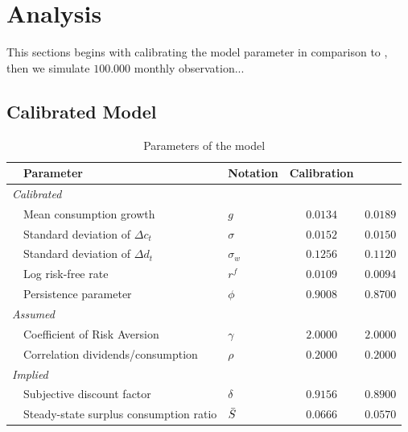 \section{Analysis} \label{sec:Analysis}

This sections begins with calibrating the model parameter in comparison to \cite{Campbell1999}, then we simulate $100.000$ monthly observation...

\subsection{Calibrated Model}

\begin{table}[H]
\begin{adjustbox}{max width=\textwidth}
\begin{threeparttable}[b]
\caption{Parameters of the model}
\label{tab:ModelCalib}
\begin{tabular}{@{}lllcc@{}}
\toprule
 & Parameter                              & Notation         & Calibration & \citet{Campbell1999}\\ \midrule 
\multicolumn{5}{l}{\textit{Calibrated}}                                            \\
 & Mean consumption growth                & $g$              & $0.0134$  & $0.0189$\\
 & Standard deviation of $\Delta c_t$     & $\sigma$         & $0.0152$  & $0.0150$\\
 & Standard deviation of $\Delta d_t$     & $\sigma_w$       & $0.1256$  & $0.1120$\\
 & Log risk-free rate                     & $r^f$            & $0.0109$  & $0.0094$\\
 & Persistence parameter                  & $\phi$           & $0.9008$  & $0.8700$\\
 \multicolumn{5}{l}{\textit{Assumed}}                                              \\
 & Coefficient of Risk Aversion           & $\gamma$         & $2.0000$  & $2.0000$\\
 & Correlation dividends/consumption      & $\rho$           & $0.2000$  & $0.2000$\\
\multicolumn{5}{l}{\textit{Implied}}                                               \\
 & Subjective discount factor             & $\delta$         & $0.9156$  & $0.8900$\\
 & Steady-state surplus consumption ratio & $\Bar{S}$        & $0.0666$  & $0.0570$\\

\end{tabular}
\end{threeparttable}
\end{adjustbox}
\end{table}
